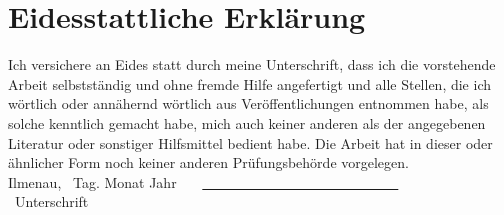 \renewcommand\refname{Eidesstattliche Erklärung} \section*{Eidesstattliche Erklärung}


\vspace*{5em}
\normalsize
Ich versichere an Eides statt durch meine Unterschrift, dass ich die vorstehende Arbeit selbstständig und ohne fremde Hilfe angefertigt und alle Stellen, die ich wörtlich oder annähernd wörtlich aus Veröffentlichungen entnommen habe, als solche kenntlich gemacht habe, mich auch keiner anderen als der angegebenen Literatur oder sonstiger Hilfsmittel bedient habe. Die Arbeit hat in dieser oder ähnlicher Form noch keiner anderen Prüfungsbehörde vorgelegen.
  \vspace*{5em}
\\
Ilmenau, \ Tag. Monat Jahr \ \ \ \underline{\ \ \ \ \ \ \ \ \ \ \ \ \ \ \ \ \ \
     \ \ \ \ \ \ \ \ \ \ }\\
\hspace*{12.6em}\small{\ Unterschrift}